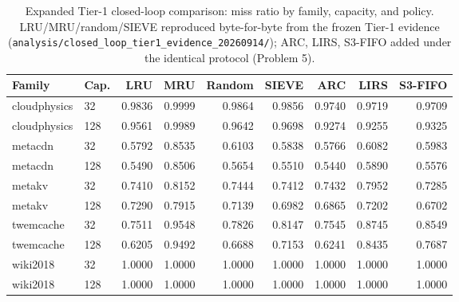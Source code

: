 \begin{table}[t]
  \centering
  \small
  \caption{Expanded Tier-1 closed-loop comparison: miss ratio by family, capacity, and policy. LRU/MRU/random/SIEVE reproduced byte-for-byte from the frozen Tier-1 evidence (\texttt{analysis/closed\_loop\_tier1\_evidence\_20260914/}); ARC, LIRS, S3-FIFO added under the identical protocol (Problem 5).}
  \label{tab:expanded-closed-loop}
  \begin{tabular}{llrrrrrrr}
    \toprule
    Family & Cap. & LRU & MRU & Random & SIEVE & ARC & LIRS & S3-FIFO \\
    \midrule
    cloudphysics & 32 & 0.9836 & 0.9999 & 0.9864 & 0.9856 & 0.9740 & 0.9719 & 0.9709 \\
    cloudphysics & 128 & 0.9561 & 0.9989 & 0.9642 & 0.9698 & 0.9274 & 0.9255 & 0.9325 \\
    metacdn & 32 & 0.5792 & 0.8535 & 0.6103 & 0.5838 & 0.5766 & 0.6082 & 0.5983 \\
    metacdn & 128 & 0.5490 & 0.8506 & 0.5654 & 0.5510 & 0.5440 & 0.5890 & 0.5576 \\
    metakv & 32 & 0.7410 & 0.8152 & 0.7444 & 0.7412 & 0.7432 & 0.7952 & 0.7285 \\
    metakv & 128 & 0.7290 & 0.7915 & 0.7139 & 0.6982 & 0.6865 & 0.7202 & 0.6702 \\
    twemcache & 32 & 0.7511 & 0.9548 & 0.7826 & 0.8147 & 0.7545 & 0.8745 & 0.8549 \\
    twemcache & 128 & 0.6205 & 0.9492 & 0.6688 & 0.7153 & 0.6241 & 0.8435 & 0.7687 \\
    wiki2018 & 32 & 1.0000 & 1.0000 & 1.0000 & 1.0000 & 1.0000 & 1.0000 & 1.0000 \\
    wiki2018 & 128 & 1.0000 & 1.0000 & 1.0000 & 1.0000 & 1.0000 & 1.0000 & 1.0000 \\
    \bottomrule
  \end{tabular}
\end{table}
